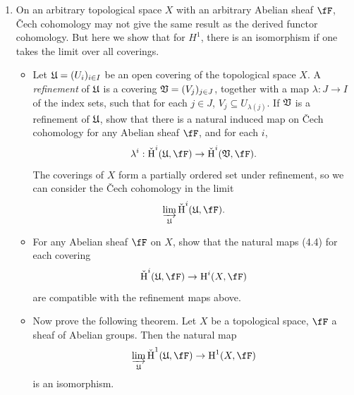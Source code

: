 \documentclass[a4paper]{article}
\begin{document}
\begin{enumerate} [label=\textbf{\arabic*.}, leftmargin=0em]
  \item On an arbitrary topological space $X$ with an arbitrary Abelian sheaf $\fF$, Čech cohomology may not give the same result as the derived functor cohomology.
        But here we show that for $H^1$, there is an isomorphism if one takes the limit over all coverings.
        \begin{itemize}
          \item[(a)] Let $\mathfrak{U} = (U_i)_{i \in I}$ be an open covering of the topological space $X$.
                A \textit{refinement} of $\mathfrak{U}$ is a covering $\mathfrak{V} = (V_j)_{j \in J}$, together with a map $\lambda : J \to I$ of the index sets, such that for each $j \in J$, $V_j \subseteq U_{\lambda(j)}$.
                If $\mathfrak{V}$ is a refinement of $\mathfrak{U}$, show that there is a natural induced map on Čech cohomology for any Abelian sheaf $\fF$, and for each $i$,
                \begin{equation*}
                  \lambda^i : \check{\cH}^i(\goth{U}, \fF) \to \check{\cH}^i(\goth{V}, \fF).
                \end{equation*}
                The coverings of $X$ form a partially ordered set under refinement, so we can consider the Čech cohomology in the limit
                \begin{equation*}
                  \varinjlim_\goth{U} \check{\cH}^i(\goth{U}, \fF).
                \end{equation*}

          \item[(b)]  For any Abelian sheaf $\fF$ on $X$, show that the natural maps (4.4) for each covering
                \begin{equation*}
                  \check{\cH}^i(\goth{U}, \fF) \to \cH^i(X, \fF)
                \end{equation*}
                are compatible with the refinement maps above.

          \item[(c)] Now prove the following theorem.
                Let $X$ be a topological space, $\fF$ a sheaf of Abelian groups.
                Then the natural map
                \begin{equation*}
                  \varinjlim_\goth{U} \check{\cH}^1(\goth{U}, \fF) \to \cH^1(X, \fF)
                \end{equation*}
                is an isomorphism.
        \end{itemize}


\end{enumerate}
\end{document}
